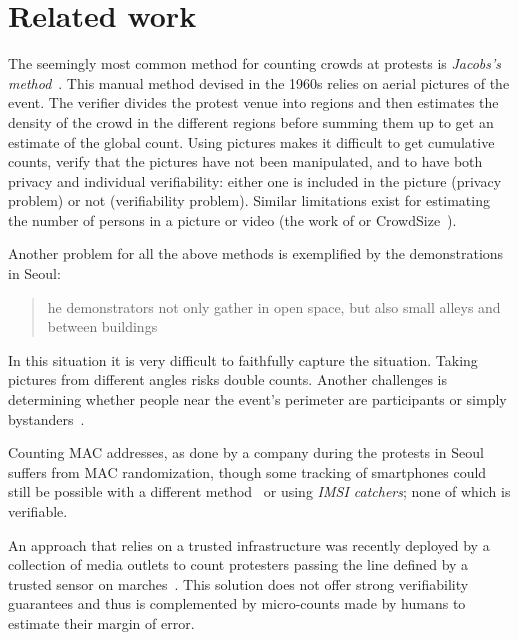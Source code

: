 \section{Related work}%
\label{related-work}



The seemingly most common method for counting crowds at protests is \emph{Jacobs's method}~\cite{2016DemonstrationsInSeoul,BBCHowToCountProtestNumbers,HowWillWeKnowTrumpInauguralCrowdSize,TheXManMarch,TheCrowdNumbersGame}.
This manual method devised in the 1960s relies on aerial pictures of the event.
The verifier divides the protest venue into regions and then estimates the density of the crowd in the different regions before summing them up to get an estimate of the global count. Using pictures makes it difficult to get cumulative counts, verify that the pictures have not been manipulated, and to have both privacy and individual verifiability: either one is included in the picture (privacy problem) or not (verifiability problem). Similar limitations exist for estimating the number of persons in a picture or video (\eg the work of \cite{NNCrowdCounting} or  CrowdSize~\cite{CrowdSize}).

Another problem for all the above methods is exemplified by the demonstrations in Seoul:
\blockcquote{2016DemonstrationsInSeoul}{%
  he demonstrators not only gather in open space, but also small alleys and between buildings%
}.
In this situation it is very difficult to faithfully capture the situation.
Taking pictures from different angles risks double counts. Another challenges is determining whether people near the event's perimeter are participants or simply bystanders~\cite{HowToEstimateCrowdSize}.

Counting MAC addresses, as done by a company during the protests in Seoul~\cite{2016DemonstrationsInSeoul} suffers from MAC randomization, though some tracking of smartphones could still be possible with a different method~\cite{WhyMACRandomizationIsNotEnough} or using \emph{IMSI catchers}; none of which is verifiable.

An approach that relies on a trusted infrastructure was recently deployed by a collection of media outlets to count protesters passing the line defined by a trusted sensor on marches~\cite{LeMondeProtestingSolution}. 
This solution does not offer strong verifiability guarantees and thus is complemented by micro-counts made by humans to estimate their margin of error.

